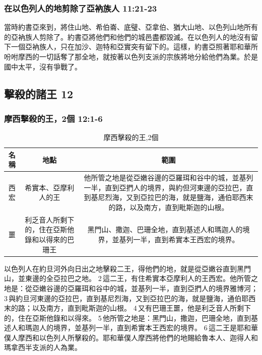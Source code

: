 \subsubsection{在以色列人的地剪除了亞衲族人 11:21-23}
當時約書亞來到，將住山地、希伯崙、底璧、亞拿伯、猶大山地、以色列山地所有的亞衲族人剪除了。約書亞將他們和他們的城邑盡都毀滅。在以色列人的地沒有留下一個亞衲族人，只在加沙、迦特和亞實突有留下的。這樣，約書亞照著耶和華所吩咐摩西的一切話奪了那全地，就按著以色列支派的宗族將地分給他們為業。於是國中太平，沒有爭戰了。

\subsection{擊殺的諸王 12 }
\subsubsection{摩西擊殺的王，2個 12:1-6}
\begin{table}[H]
\centering
\begin{tabular}{|c|c|c|}
\hline
\hline
名稱 & 地點 &範圍 \\\hline
西宏&\multicolumn{1}{m{2cm}|}{希實本、亞摩利人的王}& \multicolumn{1}{m{12cm}|}{他所管之地是從亞嫩谷邊的亞羅珥和谷中的城，並基列一半，直到亞捫人的境界，與約但河東邊的亞拉巴，直到基尼烈海，又到亞拉巴的海，就是鹽海，通伯耶西末的路，以及南方，直到毗斯迦的山根。} \\\hline
噩  &\multicolumn{1}{m{2cm}|}{利乏音人所剩下的，住在亞斯他錄和以得來的巴珊王}&\multicolumn{1}{m{12cm}|}{黑門山、撒迦、巴珊全地，直到基述人和瑪迦人的境界，並基列一半，直到希實本王西宏的境界。} \\\hline
\end{tabular}
\caption{摩西擊殺的王,2個}
\end{table}
以色列人在約旦河外向日出之地擊殺二王，得他們的地，就是從亞嫩谷直到黑門山，並東邊的全亞拉巴之地。 2 這二王，有住希實本亞摩利人的王西宏。他所管之地是：從亞嫩谷邊的亞羅珥和谷中的城，並基列一半，直到亞捫人的境界雅博河； 3 與約旦河東邊的亞拉巴，直到基尼烈海，又到亞拉巴的海，就是鹽海，通伯耶西末的路；以及南方，直到毗斯迦的山根。 4 又有巴珊王噩，他是利乏音人所剩下的，住在亞斯他錄和以得來。 5 他所管之地是：黑門山，撒迦，巴珊全地，直到基述人和瑪迦人的境界，並基列一半，直到希實本王西宏的境界。 6 這二王是耶和華僕人摩西和以色列人所擊殺的。耶和華僕人摩西將他們的地賜給魯本人、迦得人和瑪拿西半支派的人為業。

